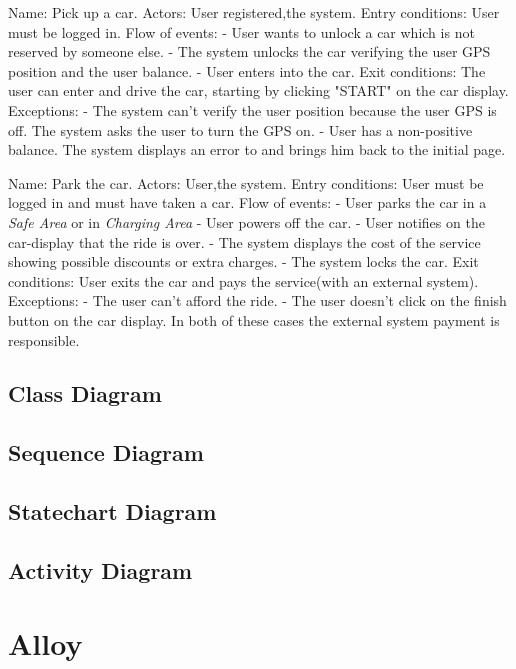 \documentclass[11pt,a4paper]{report}
\begin{document}
Name: Pick up a car.
Actors: User registered,the system.
Entry conditions: User must be logged in.
Flow of events:
- User wants to unlock a car which is not reserved by someone else.
- The system unlocks the car verifying the user GPS position and the user balance.
- User enters into the car.
Exit conditions: The user can enter and drive the car, starting by clicking "START" on the car display.
Exceptions:
- The system can't verify the user position because the user GPS is off.
The system asks the user to turn the GPS on.
- User has a non-positive balance.
The system displays an error to and brings him back to the initial page.


Name: Park the car.
Actors: User,the system.
Entry conditions: User must be logged in and must have taken a car.
Flow of events:
- User parks the car in a \textit{Safe Area} or in \textit{Charging Area}
- User powers off the car.
- User notifies on the car-display that the ride is over.
- The system displays the cost of the service showing possible discounts or extra charges.
- The system locks the car.
Exit conditions: User exits the car and pays the service(with an external system).
Exceptions:
- The user can't afford the ride.
- The user doesn't click on the finish button on the car display.
In both of these cases the external system payment is responsible.
\subsection{Class Diagram}
\subsection{Sequence Diagram}
\subsection{Statechart Diagram}
\subsection{Activity Diagram}
\section{Alloy}
\end{document}
